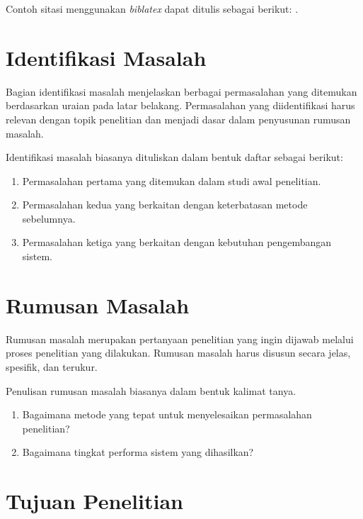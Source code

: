 Contoh sitasi menggunakan \textit{biblatex} dapat ditulis sebagai berikut:
\parencite{llama2024}.

\section{Identifikasi Masalah}

Bagian identifikasi masalah menjelaskan berbagai permasalahan yang ditemukan
berdasarkan uraian pada latar belakang. Permasalahan yang diidentifikasi harus
relevan dengan topik penelitian dan menjadi dasar dalam penyusunan rumusan
masalah.

Identifikasi masalah biasanya dituliskan dalam bentuk daftar sebagai berikut:

\begin{enumerate}
\item Permasalahan pertama yang ditemukan dalam studi awal penelitian.
\item Permasalahan kedua yang berkaitan dengan keterbatasan metode sebelumnya.
\item Permasalahan ketiga yang berkaitan dengan kebutuhan pengembangan sistem.
\end{enumerate}

\section{Rumusan Masalah}

Rumusan masalah merupakan pertanyaan penelitian yang ingin dijawab melalui
proses penelitian yang dilakukan. Rumusan masalah harus disusun secara jelas,
spesifik, dan terukur.

Penulisan rumusan masalah biasanya dalam bentuk kalimat tanya.

\begin{enumerate}
\item Bagaimana metode yang tepat untuk menyelesaikan permasalahan penelitian?
\item Bagaimana tingkat performa sistem yang dihasilkan?
\end{enumerate}

\section{Tujuan Penelitian}

